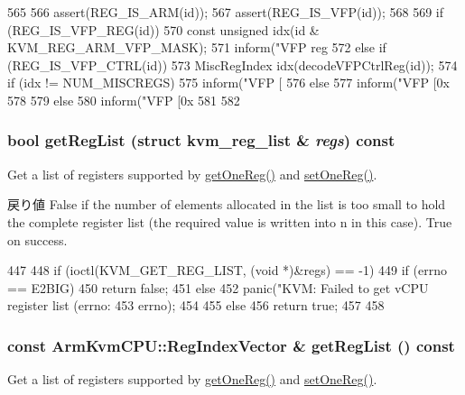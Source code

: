 \begin{DoxyCode}
565 {
566     assert(REG_IS_ARM(id));
567     assert(REG_IS_VFP(id));
568 
569     if (REG_IS_VFP_REG(id)) {
570         const unsigned idx(id & KVM_REG_ARM_VFP_MASK);
571         inform("VFP reg %
572     } else if (REG_IS_VFP_CTRL(id)) {
573         MiscRegIndex idx(decodeVFPCtrlReg(id));
574         if (idx != NUM_MISCREGS) {
575             inform("VFP [%
576         } else {
577             inform("VFP [0x%
578         }
579     } else {
580         inform("VFP [0x%
581     }
582 }
\end{DoxyCode}
\hypertarget{classArmKvmCPU_a8a90fa6e1883cd37fc5cd411a56331a7}{
\subsubsection[{getRegList}]{\setlength{\rightskip}{0pt plus 5cm}bool getRegList (struct kvm\_\-reg\_\-list \& {\em regs}) const}}
\label{classArmKvmCPU_a8a90fa6e1883cd37fc5cd411a56331a7}
Get a list of registers supported by \hyperlink{classBaseKvmCPU_ab5a47c64ebf5a4de2539c6f71f7acc51}{getOneReg()} and \hyperlink{classBaseKvmCPU_ad96695f9596f808056054f3c2026b818}{setOneReg()}.

\begin{DoxyReturn}{戻り値}
False if the number of elements allocated in the list is too small to hold the complete register list (the required value is written into n in this case). True on success. 
\end{DoxyReturn}



\begin{DoxyCode}
447 {
448     if (ioctl(KVM_GET_REG_LIST, (void *)&regs) == -1) {
449         if (errno == E2BIG) {
450             return false;
451         } else {
452             panic("KVM: Failed to get vCPU register list (errno: %
453                   errno);
454         }
455     } else {
456         return true;
457     }
458 }
\end{DoxyCode}
\hypertarget{classArmKvmCPU_ae852422eea452a5cdcf96e300ec91cc7}{
\subsubsection[{getRegList}]{\setlength{\rightskip}{0pt plus 5cm}const {\bf ArmKvmCPU::RegIndexVector} \& getRegList () const}}
\label{classArmKvmCPU_ae852422eea452a5cdcf96e300ec91cc7}
Get a list of registers supported by \hyperlink{classBaseKvmCPU_ab5a47c64ebf5a4de2539c6f71f7acc51}{getOneReg()} and \hyperlink{classBaseKvmCPU_ad96695f9596f808056054f3c2026b818}{setOneReg()}. 


